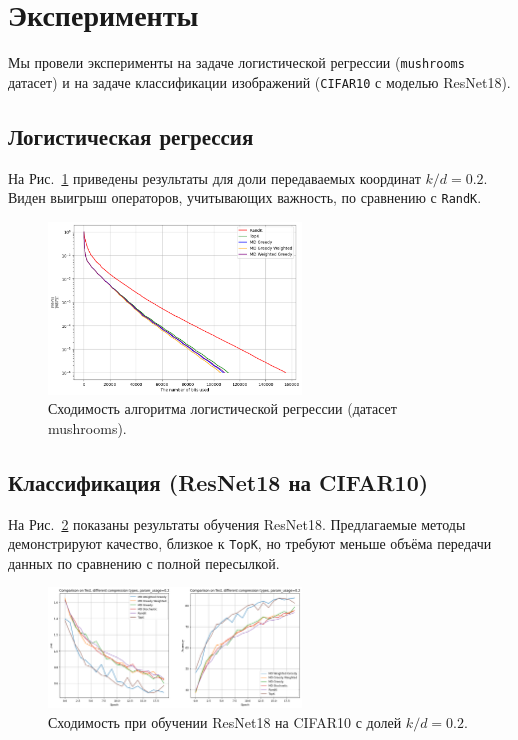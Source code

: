 \documentclass{article}
\begin{document}
\section{Эксперименты}
Мы провели эксперименты на задаче логистической регрессии (\texttt{mushrooms} датасет) и на задаче классификации изображений (\texttt{CIFAR10} с моделью ResNet18).

\subsection{Логистическая регрессия}
На Рис.~\ref{fig:logreg} приведены результаты для доли передаваемых координат $k/d = 0.2$. Виден выигрыш операторов, учитывающих важность, по сравнению с \texttt{RandK}.
\begin{figure}[h]
\centering
\includegraphics[width=0.6\textwidth]{../figures/LogReg}
\caption{Сходимость алгоритма логистической регрессии (датасет mushrooms).}
\label{fig:logreg}
\end{figure}

\subsection{Классификация (ResNet18 на CIFAR10)}
На Рис.~\ref{fig:cifar10} показаны результаты обучения ResNet18. Предлагаемые методы демонстрируют качество, близкое к \texttt{TopK}, но требуют меньше объёма передачи данных по сравнению с полной пересылкой.
\begin{figure}[h]
\centering
\includegraphics[width=0.6\textwidth]{../figures/ResNet_CIFAR10}
\caption{Сходимость при обучении ResNet18 на CIFAR10 с долей $k/d = 0.2$.}
\label{fig:cifar10}
\end{figure}
\end{document}
